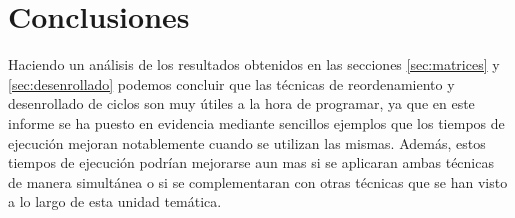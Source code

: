 \section{Conclusiones}

Haciendo un análisis de los resultados obtenidos en las secciones
\ref{sec:matrices} y \ref{sec:desenrollado} podemos concluir que las
técnicas de reordenamiento y desenrollado de ciclos son muy útiles a
la hora de programar, ya que en este informe se ha puesto en evidencia
mediante sencillos ejemplos que los tiempos de ejecución mejoran
notablemente cuando se utilizan las mismas. Además, estos tiempos de
ejecución podrían mejorarse aun mas si se aplicaran ambas técnicas de
manera simultánea o si se complementaran con otras técnicas que se han
visto a lo largo de esta unidad temática.

 








